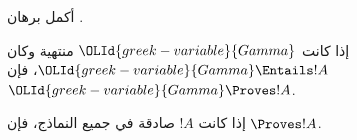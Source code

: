 \documentclass[../../../include/open-logic-section]{subfiles}
\begin{document}
\begin{prob}
أكمل برهان .
\end{prob}

\begin{cor}
إذا كانت ${\OLId{greek-variable}{Gamma}}$ منتهية وكان ${\OLId{greek-variable}{Gamma}} \Entails !A$، فإن
${\OLId{greek-variable}{Gamma}} \Proves !A$.
\end{cor}

\begin{cor}
إذا كانت $!A$ صادقة في جميع النماذج، فإن $\Proves !A$.
\end{cor}
\end{document}
